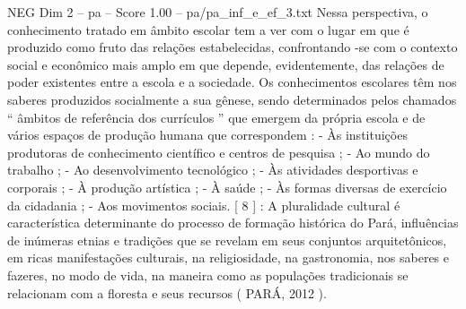 \begin{textsample}{NEG Dim 2 – pa – Score 1.00 – pa/pa\_inf\_e\_ef\_3.txt}
Nessa perspectiva, o conhecimento tratado em âmbito escolar tem a ver com o lugar em que é produzido como fruto das relações estabelecidas, confrontando -se com o contexto social e econômico mais amplo em que depende, evidentemente, das relações de poder existentes entre a escola e a sociedade.
Os conhecimentos escolares têm nos saberes produzidos socialmente a sua gênese, sendo determinados pelos chamados “ âmbitos de referência dos currículos ” que emergem da própria escola e de vários espaços de produção humana que correspondem : - Às instituições produtoras de conhecimento científico e centros de pesquisa ; - Ao mundo do trabalho ; - Ao desenvolvimento tecnológico ; - Às atividades desportivas e corporais ; - À produção artística ; - À saúde ; - Às formas diversas de exercício da cidadania ; - Aos movimentos sociais. [ 8 ] : A pluralidade cultural é característica determinante do processo de formação histórica do Pará, influências de inúmeras etnias e tradições que se revelam em seus conjuntos arquitetônicos, em ricas manifestações culturais, na religiosidade, na gastronomia, nos saberes e fazeres, no modo de vida, na maneira como as populações tradicionais se relacionam com a floresta e seus recursos ( PARÁ, 2012 ).

\end{textsample}
